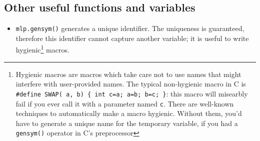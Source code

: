 \subsection{Other useful functions and variables}

\begin{itemize}
\item{\tt mlp.gensym()} generates a unique identifier. The uniqueness
  is guaranteed, therefore this identifier cannot capture another
  variable; it is useful to write hygienic\footnote{Hygienic macros
    are macros which take care not to use names that might interfere
    with user-provided names. The typical non-hygienic macro in C
    is {\tt \#define SWAP( a, b) \{ int c=a; a=b; b=c; \}}: this macro
    will misearbly fail if you ever call it with a parameter named
    {\tt c}. There are well-known techniques to automatically make a
    macro hygienic. Without them, you'd have to generate a unique name
    for the temporary variable, if you had a {\tt gensym()} operator
    in C's preprocessor} macros. 
\end{itemize}
